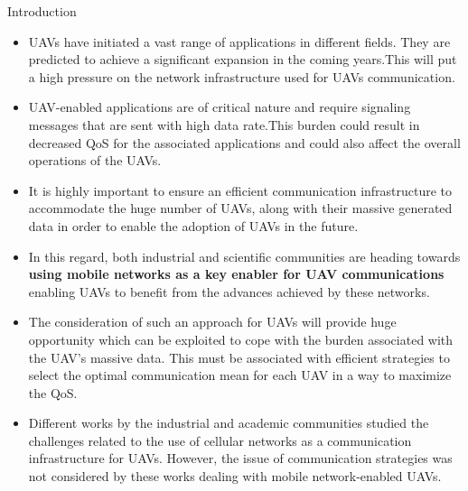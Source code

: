 \documentclass{beamer}
\begin{document}
\begin{frame}{Introduction}
\begin{itemize}
    \item UAVs have initiated a vast range of applications in different fields. They are predicted to achieve a significant expansion in the coming years.This will put a high pressure on the network infrastructure used for UAVs communication.
    \item UAV-enabled applications are of critical nature and require signaling messages that are sent with high data rate.This burden could result in decreased QoS for the associated applications and could also affect the overall operations of the UAVs.
    \item It is highly important to ensure an efficient communication infrastructure to accommodate the huge number of UAVs, along with their massive generated data in order to enable the adoption of UAVs in the future.
\end{itemize}
\end{frame}

\begin{frame}{}
 \begin{itemize}
     \item In this regard, both industrial and scientific communities are heading towards \textbf{using mobile networks as a key enabler for UAV communications} enabling UAVs to benefit from the advances achieved by these networks.
     \item The consideration of such an approach for UAVs will provide huge opportunity which can be exploited to cope with the burden associated with the UAV's massive data. This must be associated with efficient strategies to select the optimal communication mean for each UAV in a way to maximize the QoS.
     \item Different works by the industrial and academic communities studied   the challenges related to the use of cellular networks as a communication infrastructure for UAVs. However, the issue of communication strategies was not considered by these works dealing with mobile network-enabled UAVs.
 \end{itemize}   
\end{frame}
\end{document}
